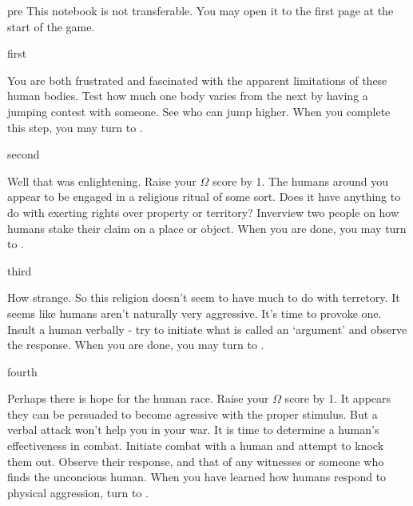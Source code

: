 \documentclass[notebook]{guildcamp1}
\begin{document}

\startnotebook{\nAlienAgression{}}

\begin{page}{pre}
This notebook is not transferable. You may open it to the first page at the start of the game.
\end{page}

\begin{page}{first}

You are both frustrated and fascinated with the apparent limitations of these human bodies.  Test how much one body varies from the next by having a jumping contest with someone. See who can jump higher. When you complete this step, you may turn to .

\end{page}

\begin{page}{second}

Well that was enlightening. Raise your $\Omega$ score by 1.  The humans around you appear to be engaged in a religious ritual of some sort. Does it have anything to do with exerting rights over property or territory? Inverview two people on how humans stake their claim on a place or object. When you are done, you may turn to .

\end{page}

\begin{page}{third}

How strange. So this religion doesn't seem to have much to do with terretory. It seems like humans aren't naturally very aggressive. It's time to provoke one. Insult a human verbally - try to initiate what is called an `argument' and observe the response. When you are done, you may turn to .

\end{page}

\begin{page}{fourth}

Perhaps there is hope for the human race.  Raise your $\Omega$ score by 1. It appears they can be persuaded to become agressive with the proper stimulus. But a verbal attack won't help you in your war. It is time to determine a human's effectiveness in combat.  Initiate combat with a  human and attempt to knock them out. Observe their response, and that of any witnesses or someone who finds the unconcious human. When you have learned how humans respond to physical aggression, turn to .

\end{page}
\end{document}
